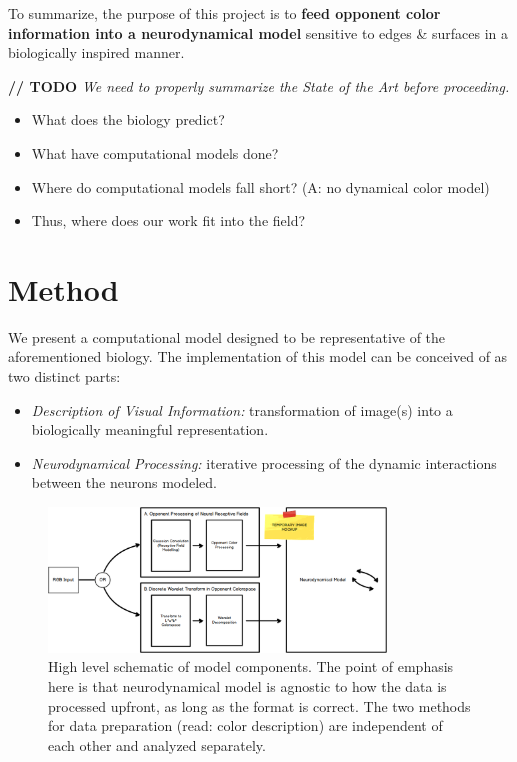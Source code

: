 \documentclass[journal,onecolumn]{IEEEtran}
\begin{document}
To summarize, the purpose of this project is to \textbf{feed opponent color information into a neurodynamical model} sensitive to edges \& surfaces in a biologically inspired manner.

\textbf{// TODO} \textit{We need to properly summarize the State of the Art before proceeding.}
\begin{itemize}
    \item What does the biology predict?
    \item What have computational models done?
    \item Where do computational models fall short? (A: no dynamical color model)
    \item Thus, where does our work fit into the field?
\end{itemize}


%
%
%
\section{Method}

We present a computational model designed to be representative of the aforementioned biology. The implementation of this model can be conceived of as two distinct parts:
\begin{itemize}
    \item \textit{Description of Visual Information:} transformation of image(s) into a biologically meaningful representation.
    \item \textit{Neurodynamical Processing:} iterative processing of the dynamic interactions between the neurons modeled.
\end{itemize}

\begin{figure}[H]
    \centering
    \includegraphics[width=0.8\textwidth]{model1_mockup}
    \caption{High level schematic of model components. The point of emphasis here is that neurodynamical model is agnostic to how the data is processed upfront, as long as the format is correct. The two methods for data preparation (read: color description) are independent of each other and analyzed separately.}
    \label{fig:model-parts}
\end{figure}
\end{document}
